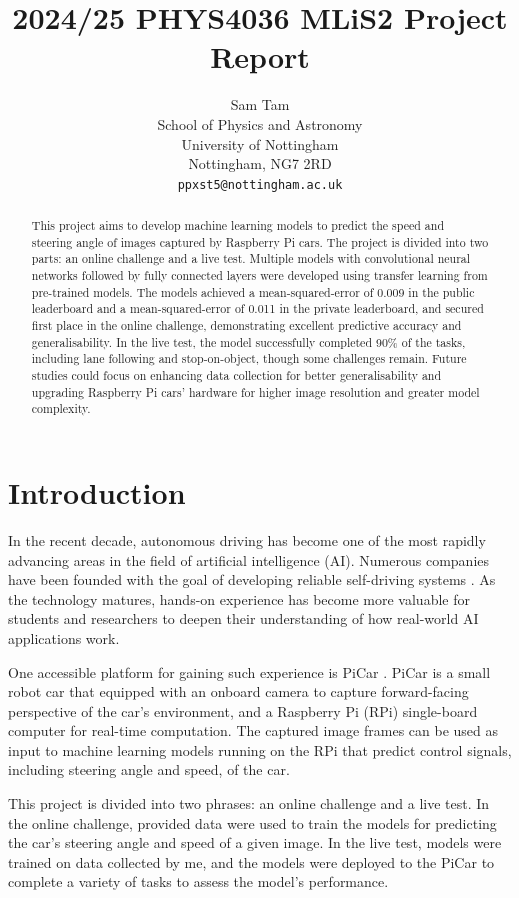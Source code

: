 \documentclass{article}
\title{2024/25 PHYS4036 MLiS2 Project Report}
\author{%
  Sam Tam \\
  School of Physics and Astronomy\\
  University of Nottingham\\
  Nottingham, NG7 2RD \\
  \texttt{ppxst5@nottingham.ac.uk}
}
\begin{document}
\maketitle


\begin{abstract}
  This project aims to develop machine learning models to predict the speed and steering angle of images captured by Raspberry Pi cars. The project is divided into two parts: an online challenge and a live test. Multiple models with convolutional neural networks followed by fully connected layers were developed using transfer learning from pre-trained models. The models achieved a mean-squared-error of 0.009 in the public leaderboard and a mean-squared-error of 0.011 in the private leaderboard, and secured first place in the online challenge, demonstrating excellent predictive accuracy and generalisability. In the live test, the model successfully completed 90\% of the tasks, including lane following and stop-on-object, though some challenges remain. Future studies could focus on enhancing data collection for better generalisability and upgrading Raspberry Pi cars' hardware for higher image resolution and greater model complexity.
\end{abstract}

\section{Introduction}
In the recent decade, autonomous driving has become one of the most rapidly advancing areas in the field of artificial intelligence (AI). Numerous companies have been founded with the goal of developing reliable self-driving systems \citep{Law_2023}. As the technology matures, hands-on experience has become more valuable for students and researchers to deepen their understanding of how real-world AI applications work.

One accessible platform for gaining such experience is PiCar \citep{SunFounder}. PiCar is a small robot car that equipped with an onboard camera to capture forward-facing perspective of the car's environment, and a Raspberry Pi (RPi) single-board computer \citep{RaspberryPi} for real-time computation. The captured image frames can be used as input to machine learning models running on the RPi that predict control signals, including steering angle and speed, of the car.

This project is divided into two phrases: an online challenge and a live test. In the online challenge, provided data were used to train the models for predicting the car's steering angle and speed of a given image. In the live test, models were trained on data collected by me, and the models were deployed to the PiCar to complete a variety of tasks to assess the model's performance.
\end{document}
